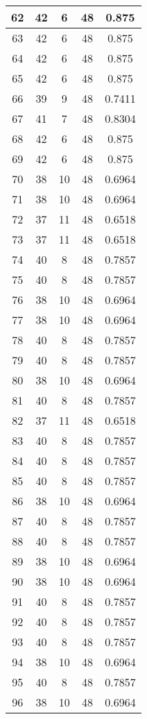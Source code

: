 \documentclass[letterpaper, 12pt]{article}
\begin{document}
\begin{longtable}{|c|c|c|c|c|}
\hline
62 & 42 & 6 & 48 & 0.875 \\
\hline
63 & 42 & 6 & 48 & 0.875 \\
\hline
64 & 42 & 6 & 48 & 0.875 \\
\hline
65 & 42 & 6 & 48 & 0.875 \\
\hline
66 & 39 & 9 & 48 & 0.7411 \\
\hline
67 & 41 & 7 & 48 & 0.8304 \\
\hline
68 & 42 & 6 & 48 & 0.875 \\
\hline
69 & 42 & 6 & 48 & 0.875 \\
\hline
70 & 38 & 10 & 48 & 0.6964 \\
\hline
71 & 38 & 10 & 48 & 0.6964 \\
\hline
72 & 37 & 11 & 48 & 0.6518 \\
\hline
73 & 37 & 11 & 48 & 0.6518 \\
\hline
74 & 40 & 8 & 48 & 0.7857 \\
\hline
75 & 40 & 8 & 48 & 0.7857 \\
\hline
76 & 38 & 10 & 48 & 0.6964 \\
\hline
77 & 38 & 10 & 48 & 0.6964 \\
\hline
78 & 40 & 8 & 48 & 0.7857 \\
\hline
79 & 40 & 8 & 48 & 0.7857 \\
\hline
80 & 38 & 10 & 48 & 0.6964 \\
\hline
81 & 40 & 8 & 48 & 0.7857 \\
\hline
82 & 37 & 11 & 48 & 0.6518 \\
\hline
83 & 40 & 8 & 48 & 0.7857 \\
\hline
84 & 40 & 8 & 48 & 0.7857 \\
\hline
85 & 40 & 8 & 48 & 0.7857 \\
\hline
86 & 38 & 10 & 48 & 0.6964 \\
\hline
87 & 40 & 8 & 48 & 0.7857 \\
\hline
88 & 40 & 8 & 48 & 0.7857 \\
\hline
89 & 38 & 10 & 48 & 0.6964 \\
\hline
90 & 38 & 10 & 48 & 0.6964 \\
\hline
91 & 40 & 8 & 48 & 0.7857 \\
\hline
92 & 40 & 8 & 48 & 0.7857 \\
\hline
93 & 40 & 8 & 48 & 0.7857 \\
\hline
94 & 38 & 10 & 48 & 0.6964 \\
\hline
95 & 40 & 8 & 48 & 0.7857 \\
\hline
96 & 38 & 10 & 48 & 0.6964 \\

\end{longtable}
\end{document}
